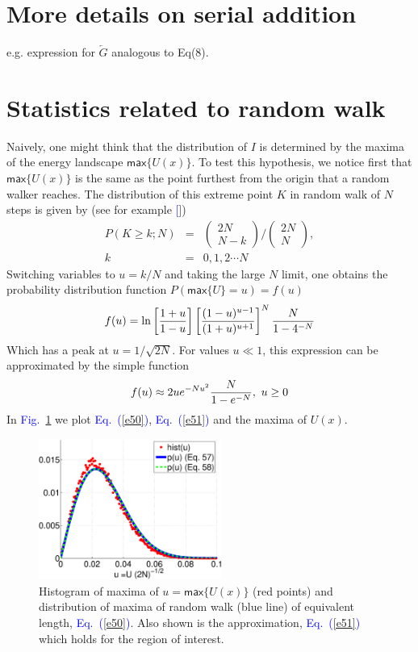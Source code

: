 \documentclass[aps,prl,floats,floatfix,twocolumn]{revtex4}
\newcommand{\mylabel}[1]{\label{#1}}
\newcommand{\beq}{\begin{eqnarray}}
\newcommand{\eeq}{\end{eqnarray}}
\newcommand{\be}[1]{\begin{eqnarray}\ifthenelse{#1=-1}
{\nonumber}{\ifthenelse{#1=0}{}{\mylabel{e#1}}}}
\newcommand{\ee}{\end{eqnarray}}
\newcommand{\Eq}[1]{\textcolor{blue}{Eq.\!\!~(\ref{#1})}}
\newcommand{\Fig}[1]{\textcolor{blue}{Fig.}\!\!~\ref{#1}}
\renewcommand{\cite}[1]{\textcolor{blue}{[\onlinecite{#1}}]} %
\begin{document}
\section{More details on serial addition}

e.g. expression for $\overleftarrow{G}$ analogous to Eq(8).




\section{Statistics related to random walk}

Naively, one might think that the distribution of $I$ 
is determined by the maxima of the energy landscape $\mathsf{max}\{U(x)\}$.
To test this hypothesis, we notice first that $\mathsf{max}\{U(x)\}$ is the same as the point furthest from the origin that a random walker reaches.
The distribution of this extreme point $K$ in random walk of $N$ steps is given by (see for example \cite{dwass})
%
\beq
P(K \geq k;N) &=&  \left(\begin{array}{c}2N \\N-k\end{array}\right) / 
\left(\begin{array}{c}2N \\N\end{array}\right),  \\ 
k &=& 0,1,2\cdots N
\eeq
%
Switching variables to $u=k/N$ and taking the large $N$ limit, 
one obtains the probability distribution function $P(\mathsf{max}\{U\} =u) = f(u)$
%
\be{50}
 f(u) = \ln \left[\frac{1+u}{1-u} \right] \left[\frac{(1-u)^{u-1}}{(1+u)^{u+1}}\right]^N \frac{N}{1-4^{-N}} 
\ee
%
Which has a peak at $u=1/\sqrt{2N}$.
For values $u\ll1$, this expression can be approximated by the simple function
%
\be{51}
f(u) \approx 2ue^{-Nu^2} \frac{N}{1-e^{-N}}, \ u\geq 0
\ee
%
In \Fig{pu} we plot \Eq{e50}, \Eq{e51} and the maxima of $U(x)$.
%
\begin{figure}
\includegraphics[width=6cm]{PmaxV.eps} 
\caption{
Histogram of maxima of $u=\mathsf{max}\{U(x)\}$ (red points) and distribution of maxima of random walk (blue line) of equivalent length, \Eq{e50}. Also shown is the approximation, \Eq{e51} which holds for the region of interest.
}
\label{pu}
\end{figure}
\end{document}
